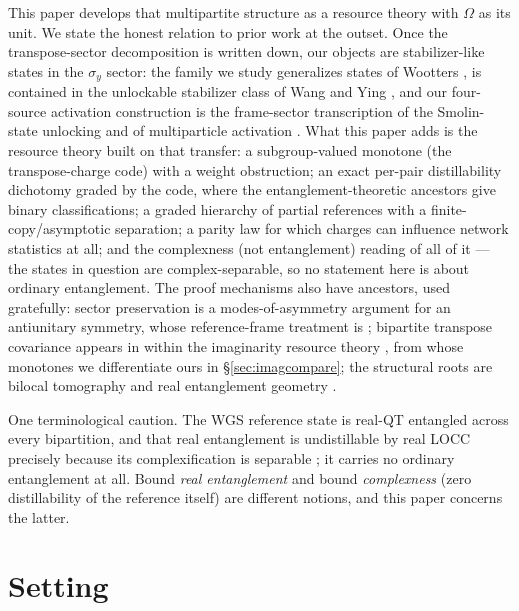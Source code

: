 \documentclass[11pt]{article}
\theoremstyle{plain}
\theoremstyle{definition}
\theoremstyle{remark}
\theoremstyle{plain}
\newcommand{\Om}{\Omega}
\begin{document}
This paper develops that multipartite structure as a resource
theory with $\Om$ as its unit. We state the honest relation to
prior work at the outset. Once the transpose-sector decomposition
is written down, our objects are stabilizer-like states in the
$\sigma_y$ sector: the family we study generalizes states of
Wootters \cite{wootters2012}, is contained in the unlockable
stabilizer class of Wang and Ying \cite{wangying2007}, and our
four-source activation construction is the frame-sector
transcription of the Smolin-state unlocking
\cite{smolin2001,augusiakhorodecki2006} and of multiparticle
activation \cite{hhh1999,durcirac2000,durcirac2000b,sst2003}. What
this paper adds is the resource theory built on that transfer: a
subgroup-valued monotone (the transpose-charge code) with a weight
obstruction; an exact per-pair distillability dichotomy graded by
the code, where the entanglement-theoretic ancestors give binary
classifications; a graded hierarchy of partial references with a
finite-copy/asymptotic separation; a parity law for which charges
can influence network statistics at all; and the complexness (not
entanglement) reading of all of it --- the states in question are
complex-separable, so no statement here is about ordinary
entanglement. The proof mechanisms also have ancestors, used
gratefully: sector preservation is a modes-of-asymmetry argument
\cite{marvian2014} for an antiunitary symmetry, whose
reference-frame treatment is \cite{gour2009}; bipartite transpose
covariance appears in \cite{kondra2023} within the imaginarity
resource theory \cite{hickeygour2018,wu2021prl,wu2021pra,wu2024},
from whose monotones we differentiate ours in
\S\ref{sec:imagcompare}; the structural roots are bilocal
tomography \cite{hardy2012} and real entanglement geometry
\cite{cfr2001}.

One terminological caution. The WGS reference state is real-QT
entangled across every bipartition, and that real entanglement is
undistillable by real LOCC precisely because its complexification
is separable \cite{wgs2025}; it carries no ordinary entanglement
at all. Bound \emph{real entanglement} and bound
\emph{complexness} (zero distillability of the reference itself)
are different notions, and this paper concerns the latter.

\section{Setting}\label{sec:setting}
\end{document}
